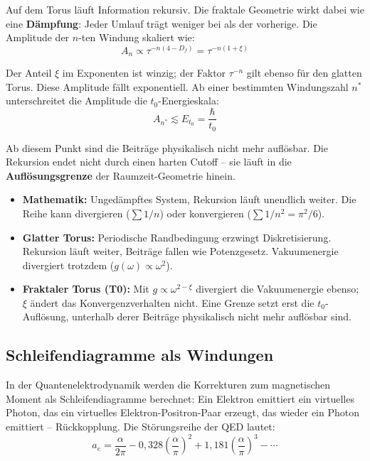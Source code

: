 	Auf dem Torus läuft Information rekursiv. Die fraktale Geometrie wirkt dabei wie eine \textbf{Dämpfung}: Jeder Umlauf trägt weniger bei als der vorherige. Die Amplitude der $n$-ten Windung skaliert wie:
	\begin{equation}
		A_n \propto \tau^{-n(4-D_f)} = \tau^{-n(1+\xi)}
	\end{equation}
	
	Der Anteil $\xi$ im Exponenten ist winzig; der Faktor $\tau^{-n}$ gilt ebenso für den glatten Torus. Diese Amplitude fällt exponentiell. Ab einer bestimmten Windungszahl $n^*$ unterschreitet die Amplitude die $t_0$-Energieskala:
	\begin{equation}
		A_{n^*} \lesssim E_{t_0} = \frac{\hbar}{t_0}
	\end{equation}
	
	Ab diesem Punkt sind die Beiträge physikalisch nicht mehr auflösbar. Die Rekursion endet nicht durch einen harten Cutoff -- sie läuft in die \textbf{Auflösungsgrenze} der Raumzeit-Geometrie hinein.
	
	\begin{keypoint}
		\begin{itemize}
			\item \textbf{Mathematik:} Ungedämpftes System, Rekursion läuft unendlich weiter. Die Reihe kann divergieren ($\sum 1/n$) oder konvergieren ($\sum 1/n^2 = \pi^2/6$).
			\item \textbf{Glatter Torus:} Periodische Randbedingung erzwingt Diskretisierung. Rekursion läuft weiter, Beiträge fallen wie Potenzgesetz. Vakuumenergie divergiert trotzdem ($g(\omega) \propto \omega^2$).
			\item \textbf{Fraktaler Torus (T0):} Mit $g \propto \omega^{2-\xi}$ divergiert die Vakuumenergie ebenso; $\xi$ ändert das Konvergenzverhalten nicht. Eine Grenze setzt erst die $t_0$-Auflösung, unterhalb derer Beiträge physikalisch nicht mehr auflösbar sind.
		\end{itemize}
	\end{keypoint}
	
	\subsection{Schleifendiagramme als Windungen}
	
	In der Quantenelektrodynamik werden die Korrekturen zum magnetischen Moment als Schleifendiagramme berechnet: Ein Elektron emittiert ein virtuelles Photon, das ein virtuelles Elektron-Positron-Paar erzeugt, das wieder ein Photon emittiert -- Rückkopplung. Die Störungsreihe der QED lautet:
	\begin{equation}
		a_e = \frac{\alpha}{2\pi} - 0{,}328 \left(\frac{\alpha}{\pi}\right)^2 + 1{,}181 \left(\frac{\alpha}{\pi}\right)^3 - \cdots
	\end{equation}
	
